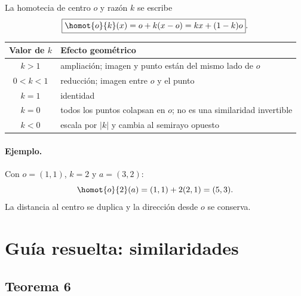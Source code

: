La homotecia de centro \(o\) y razón \(k\) se escribe
\[
  \boxed{\homot{o}{k}(x)=o+k(x-o)=kx+(1-k)o}.
\]

\begin{center}
\end{center}

\begin{center}
\begin{tabularx}{.92\textwidth}{>{\bfseries}c X}
\toprule
Valor de \(k\) & Efecto geométrico\\
\midrule
\(k>1\) & ampliación; imagen y punto están del mismo lado de \(o\)\\
\(0<k<1\) & reducción; imagen entre \(o\) y el punto\\
\(k=1\) & identidad\\
\(k=0\) & todos los puntos colapsan en \(o\); no es una similaridad invertible\\
\(k<0\) & escala por \(|k|\) y cambia al semirayo opuesto\\
\bottomrule
\end{tabularx}
\end{center}

\paragraph{Ejemplo.}
Con \(o=(1,1)\), \(k=2\) y \(a=(3,2)\):
\[
  \homot{o}{2}(a)=(1,1)+2(2,1)=(5,3).
\]
La distancia al centro se duplica y la dirección desde \(o\) se conserva.

\section{Guía resuelta: similaridades}

\subsection{Teorema 6}

